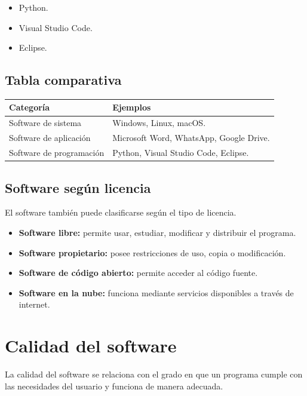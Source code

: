 \documentclass[12pt,a4paper]{article}
\begin{document}
	\begin{itemize}
		\item Python.
		\item Visual Studio Code.
		\item Eclipse.
	\end{itemize}
	
	\subsection{Tabla comparativa}
	
	\begin{longtable}{|p{4cm}|p{9cm}|}
		\hline
		\textbf{Categoría} & \textbf{Ejemplos} \\
		\hline
		Software de sistema & Windows, Linux, macOS. \\
		\hline
		Software de aplicación & Microsoft Word, WhatsApp, Google Drive. \\
		\hline
		Software de programación & Python, Visual Studio Code, Eclipse. \\
		\hline
	\end{longtable}
	
	\subsection{Software según licencia}
	
	El software también puede clasificarse según el tipo de licencia.
	
	\begin{itemize}
		\item \textbf{Software libre:} permite usar, estudiar, modificar y distribuir el programa.
		\item \textbf{Software propietario:} posee restricciones de uso, copia o modificación.
		\item \textbf{Software de código abierto:} permite acceder al código fuente.
		\item \textbf{Software en la nube:} funciona mediante servicios disponibles a través de internet.
	\end{itemize}
	
	\section{Calidad del software}
	
	La calidad del software se relaciona con el grado en que un programa cumple con las necesidades del usuario y funciona de manera adecuada.
	
\end{document}
